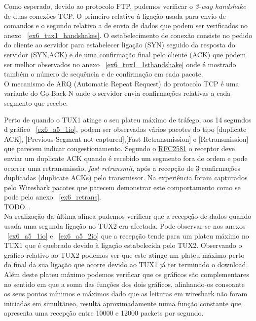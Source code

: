 \documentclass[11pt,a4paper,reqno]{report}
\numberwithin{equation}{section}
\begin{document}
Como esperado, devido ao protocolo FTP, pudemos verificar o \emph{3-way handshake} de duas conexões TCP. O primeiro relativo à ligação usada para envio de comandos e o segundo relativo a de envio de dados que podem ser verificados no anexo ~\ref{ex6_tux1_handshakes}. O estabelecimento de conexão consiste no pedido do cliente ao servidor para estabelecer ligação (SYN) seguido da resposta do servidor (SYN,ACK) e de uma confirmação final pelo cliente (ACK) que podem ser melhor observados no anexo ~\ref{ex6_tux1_1sthandshake} onde é mostrado também o número de sequência e de confirmação em cada pacote.\\

O mecanismo de ARQ (Automatic Repeat Request) do protocolo TCP é uma variante do Go-Back-N onde o servidor envia confirmações relativas a cada segmento que recebe. 

Perto de quando o TUX1 atinge o seu plateu máximo de tráfego, aos 14 segundos d gráfico ~\ref{ex6_a5_1io}, podem ser observadas vários pacotes do tipo [duplicate ACK], [Previous Segment not captured],[Fast Retransmission] e [Retransmission] que parecem indicar congestionamento.
Segundo o \href{http://www.ietf.org/rfc/rfc2581.txt}{RFC2581} o receptor deve enviar um duplicate ACK quando é recebido um segmento fora de ordem e pode ocorrer uma retransmissão, \emph{fast retransmit}, após a recepção de 3 confirmações duplicadas (duplicate ACKs) pelo transmissor. Na experiência foram capturados pelo Wireshark pacotes que parecem demonstrar este comportamento como se pode pelo anexo ~\ref{ex6_retrans}.\\


TODO...\\

Na realização da última alínea pudemos verificar que a recepção de dados quando usada uma segunda ligação no TUX2 era afectada. Pode observar-se nos anexos ~\ref{ex6_a5_1io} e ~\ref{ex6_a5_2io} que a recepção  tende para um plateu máximo no TUX1 que é quebrado devido à ligação estabelecida pelo TUX2. Observando o gráfico relativo ao TUX2 podemos ver que este atinge um plateu máximo perto do final da sua ligação que ocorre devido ao TUX1 já ter terminado o download. Além deste plateu máximo podemos verificar que os gráficos são complementares no sentido em que a soma das funções dos dois gráficos, alinhando-os consoante os seus pontos mínimos e máximos dado que as leituras em wireshark não foram iniciadas em simultâneo, resulta aproximadamente numa função constante que apresenta uma recepção entre 10000 e 12000 packets por segundo.
\end{document}
